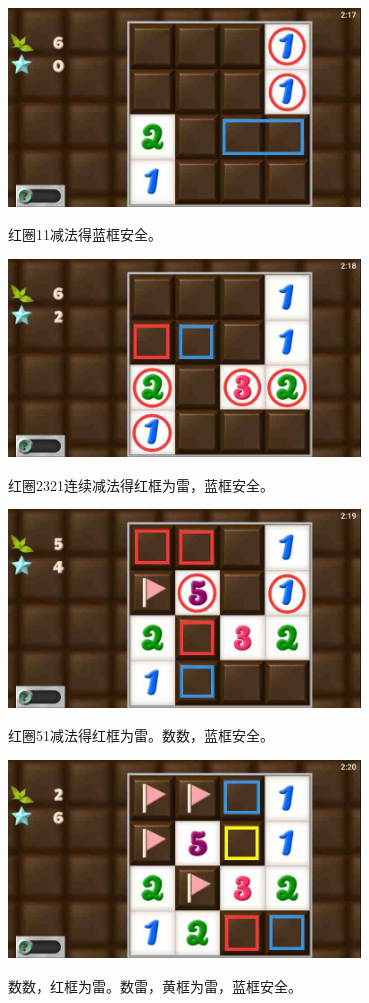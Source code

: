 \subsection{} %
\begin{center}
    \includegraphics[width=0.7\textwidth]{puzzlelow/29-1.jpg}
\end{center}
红圈11减法得蓝框安全。
\begin{center}
    \includegraphics[width=0.7\textwidth]{puzzlelow/29-2.jpg}
\end{center}
红圈2321连续减法得红框为雷，蓝框安全。
\begin{center}
    \includegraphics[width=0.7\textwidth]{puzzlelow/29-3.jpg}
\end{center}
红圈51减法得红框为雷。数数，蓝框安全。
\begin{center}
    \includegraphics[width=0.7\textwidth]{puzzlelow/29-4.jpg}
\end{center}
数数，红框为雷。数雷，黄框为雷，蓝框安全。

